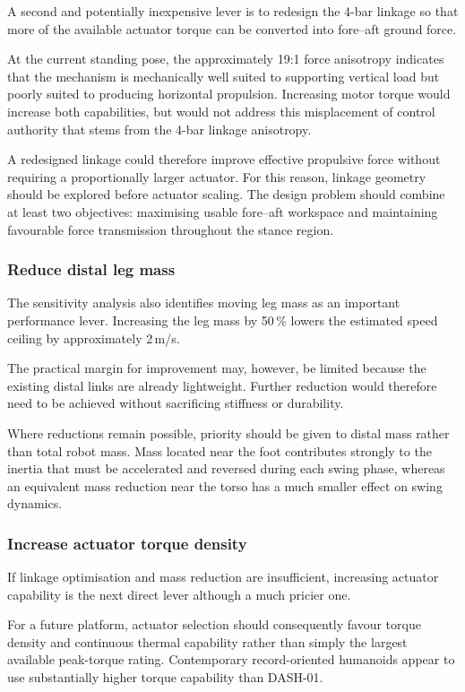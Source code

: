 A second and potentially inexpensive lever is to redesign the 4-bar linkage so that more of the available actuator torque can be converted into fore--aft ground force.

At the current standing pose, the approximately 19:1 force anisotropy indicates that the mechanism is mechanically well suited to supporting vertical load but poorly suited to producing horizontal propulsion.
Increasing motor torque would increase both capabilities, but would not address this misplacement of control authority that stems from the 4-bar linkage anisotropy.

A redesigned linkage could therefore improve effective propulsive force without requiring a proportionally larger actuator.
For this reason, linkage geometry should be explored before actuator scaling.
The design problem should combine at least two objectives: maximising usable fore--aft workspace and maintaining favourable force transmission throughout the stance region.

\subsubsection{Reduce distal leg mass}

The sensitivity analysis also identifies moving leg mass as an important performance lever.
Increasing the leg mass by 50\,\% lowers the estimated speed ceiling by approximately 2\,m/s.

The practical margin for improvement may, however, be limited because the existing distal links are already lightweight.
Further reduction would therefore need to be achieved without sacrificing stiffness or durability.

Where reductions remain possible, priority should be given to distal mass rather than total robot mass.
Mass located near the foot contributes strongly to the inertia that must be accelerated and reversed during each swing phase, whereas an equivalent mass reduction near the torso has a much smaller effect on swing dynamics.

\subsubsection{Increase actuator torque density}

If linkage optimisation and mass reduction are insufficient, increasing actuator capability is the next direct lever although a much pricier one.

For a future platform, actuator selection should consequently favour torque density and continuous thermal capability rather than simply the largest available peak-torque rating.
Contemporary record-oriented humanoids appear to use substantially higher torque capability than DASH-01. 

